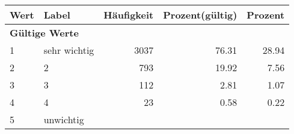      \begin{longtable}{lXrrr}
     \toprule
     \textbf{Wert} & \textbf{Label} & \textbf{Häufigkeit} & \textbf{Prozent(gültig)} & \textbf{Prozent} \\
     \endhead
     \midrule
     \multicolumn{5}{l}{\textbf{Gültige Werte}}\\

     1 &
     \multicolumn{1}{X}{ sehr wichtig   } &


       \num{3037} &
       \num[round-mode=places,round-precision=2]{76,31} &
         \num[round-mode=places,round-precision=2]{28,94} \\

     2 &
     \multicolumn{1}{X}{ 2   } &


       \num{793} &
       \num[round-mode=places,round-precision=2]{19,92} &
         \num[round-mode=places,round-precision=2]{7,56} \\

     3 &
     \multicolumn{1}{X}{ 3   } &


       \num{112} &
       \num[round-mode=places,round-precision=2]{2,81} &
         \num[round-mode=places,round-precision=2]{1,07} \\

     4 &
     \multicolumn{1}{X}{ 4   } &


       \num{23} &
       \num[round-mode=places,round-precision=2]{0,58} &
         \num[round-mode=places,round-precision=2]{0,22} \\

     5 &
     \multicolumn{1}{X}{ unwichtig   } &



\end{longtable}
